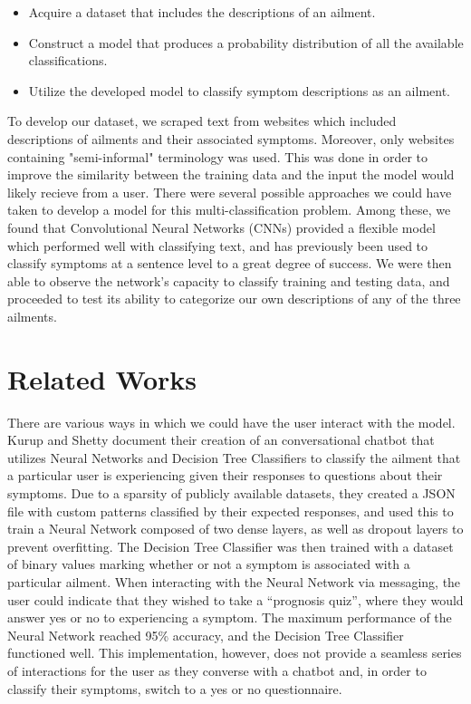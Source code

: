 \documentclass[12pt]{report}
\begin{document}
\begin{itemize}
	\item Acquire a dataset that includes the descriptions of an ailment.
	\item Construct a model that produces a probability distribution of all the available classifications.
	\item Utilize the developed model to classify symptom descriptions as an ailment.
\end{itemize}

To develop our dataset, we scraped text from websites which included
descriptions of ailments and their associated symptoms. Moreover, only websites
containing "semi-informal" terminology was used. This was done in order to
improve the similarity between the training data and the input the model would
likely recieve from a user. There were several possible approaches we could have
taken to develop a model for this multi-classification problem.
Among these, we found that Convolutional Neural Networks (CNNs)
provided a flexible model which performed well with classifying text, and has
previously been used to classify symptoms at a sentence level to a great degree
of success. We were then able to observe the network's capacity to classify
training and testing data, and proceeded to test its ability to categorize our
own descriptions of any of the three ailments.

\chapter{Related Works}
There are various ways in which we could have the user interact with the
model. Kurup and Shetty document their creation of an conversational chatbot
that utilizes Neural Networks and Decision Tree Classifiers to classify the
ailment that a particular user is experiencing given their responses to
questions about their symptoms. Due to a sparsity of publicly available
datasets, they created a JSON file with custom patterns classified by their
expected responses, and used this to train a Neural Network composed of two
dense layers, as well as dropout layers to prevent overfitting. The Decision
Tree Classifier was then trained with a dataset of binary values marking
whether or not a symptom is associated with a particular ailment. When
interacting with the Neural Network via messaging, the user could indicate
that they wished to take a “prognosis quiz”, where they would answer yes or
no to experiencing a symptom. The maximum performance of the Neural Network
reached 95\% accuracy, and the Decision Tree Classifier functioned well. This
implementation, however, does not provide a seamless series of interactions
for the user as they converse with a chatbot and, in order to classify their
symptoms, switch to a yes or no questionnaire.
\end{document}
